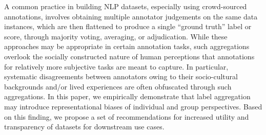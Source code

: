 A common practice in building NLP datasets, especially using crowd-sourced annotations, involves obtaining multiple annotator judgements on the same data instances, which are then flattened to produce a single ``ground truth'' label or score, through majority voting, averaging, or adjudication. While these approaches may be appropriate in certain annotation tasks, such aggregations overlook the socially constructed nature of human perceptions that annotations for relatively more subjective tasks are meant to capture. In particular, systematic disagreements between annotators owing to their socio-cultural backgrounds and/or lived experiences are often obfuscated through such aggregations. In this paper, we empirically demonstrate that label aggregation may introduce representational biases of individual and group perspectives. Based on this finding, we propose a set of recommendations for increased utility and transparency of datasets for downstream use cases.
